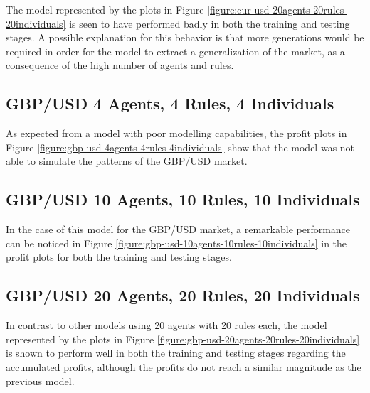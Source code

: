 The model represented by the plots in Figure
\ref{figure:eur-usd-20agents-20rules-20individuals} is seen to have performed
badly in both the training and testing stages. A possible explanation for this
behavior is that more generations would be required in order for the model to
extract a generalization of the market, as a consequence of the high number of
agents and rules.






\newpage

\subsection{GBP/USD 4 Agents, 4 Rules, 4 Individuals}
\label{results:forecast-gbp-usd-4agents-4rules-4individuals}

As expected from a model with poor modelling capabilities, the profit plots in
Figure \ref{figure:gbp-usd-4agents-4rules-4individuals} show that the model was
not able to simulate the patterns of the GBP/USD market.



\newpage

\subsection{GBP/USD 10 Agents, 10 Rules, 10 Individuals}
\label{results:forecast-gbp-usd-10agents-10rules-10individuals}

In the case of this model for the GBP/USD market, a remarkable performance can
be noticed in Figure \ref{figure:gbp-usd-10agents-10rules-10individuals} in the
profit plots for both the training and testing stages.



\newpage

\subsection{GBP/USD 20 Agents, 20 Rules, 20 Individuals}
\label{results:forecast-gbp-usd-20agents-20rules-20individuals}

In contrast to other models using 20 agents with 20 rules each, the model
represented by the plots in Figure
\ref{figure:gbp-usd-20agents-20rules-20individuals} is shown to perform well in
both the training and testing stages regarding the accumulated profits, although
the profits do not reach a similar magnitude as the previous model.









